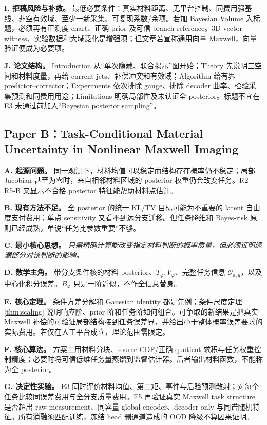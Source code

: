 \textbf{I. 拒稿风险与补救。} 最低必要条件：真实材料距离、无平台控制、同费用强基线、非空有效域、至少一新采集、可复现系数/余项。若加 Bayesian Volume 入标题，必须再有正测度 chart、正确 prior 及可信 branch reference。3D vector witness、实验数据和大域泛化是增强项；但文章若宣称通用向量 Maxwell，向量验证便成为必要项。

\textbf{J. 论文结构。} Introduction 从“单次隐藏、联合揭示”图开始；Theory 先说明三空间和材料度量，再给 current jets、补偿冲突和有效域；Algorithm 给有界 predictor--corrector；Experiments 依次排除 gauge、排除 decoder 曲率、检验采集预测和同费用用途；Limitations 明确局部性及未认证全 posterior。标题不宜在 E3 未通过前加入“Bayesian posterior sampling”。

\subsection{Paper B：Task-Conditional Material Uncertainty in Nonlinear Maxwell Imaging}
\textbf{A. 起源问题。} 同一观测下，材料均值可以稳定而结构存在概率仍不稳定；局部 Jacobian 甚至为零时，来自相邻材料区域的 posterior 权重仍会改变任务。R2--R5-B 又显示不合格 posterior 特征能帮助材料点估计。

\textbf{B. 现有方法不足。} 全 posterior 的统一 KL/TV 目标可能为不重要的 latent 自由度支付费用；单点 sensitivity 又看不到远分支迁移。但任务降维和 Bayes-risk 原则已经成熟，单说“任务比参数重要”不够。

\textbf{C. 最小核心思想。} \emph{只需精确计算能改变指定材料判断的概率质量，但必须证明遗漏部分对该判断的影响。}

\textbf{D. 数学主角。} 带分支条件核的材料 posterior、$T_\varphi,V_\varphi$、完整任务信息 $\mathcal O_{a,y}$，以及中心化积分误差。$B_\varphi$ 只是一阶近似，不作全信息替身。

\textbf{E. 核心定理。} 条件方差分解和 Gaussian identity 都是先例；条件尺度定理 \ref{thm:scaling} 说明响应阶、prior 阶和任务阶如何组合。可争取的新结果是把真实 Maxwell 补偿的可验证局部结构接到任务误差界，并给出小于整体概率误差要求的实际费用。若仅在人工平台成立，理论范围需限定。

\textbf{F. 核心算法。} 方案二用材料分块、source-CDF/正确 quotient 求积与任务权重控制精度；必要时将可信低维任务量蒸馏到监督估计器。后者输出材料函数，不能称为全 posterior。

\textbf{G. 决定性实验。} E3 同时评价材料均值、第二矩、事件与后验预测散射；对每个任务比较同误差费用与全分支质量费用。E5 再验证真实 Maxwell task structure 是否超出 raw measurement、同容量 global encoder、decoder-only 与同谱随机特征。所有消融须匹配训练，冻结 head 删通道造成的 OOD 降级不算因果证明。

